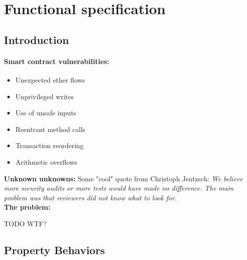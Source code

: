 \section{Functional specification}
\subsection{Introduction}
\paragraph{Smart contract vulnerabilities:}
\begin{itemize}
    \item Unexpected ether flows
    \item Unprivileged writes
    \item Use of unsafe inputs
    \item Reentrant method calls
    \item Transaction reordering
    \item Arithmetic overflows
\end{itemize}{}
\textbf{\color{blue}Unknown unknowns: }Some "cool" quote from Christoph Jentzsch: \textit{We believe more security audits or more tests would have made no difference. The main problem was that reviewers did not know what to look for.}\\
\textbf{The problem: \newline}
\begin{minipage}{0.5\linewidth}
    \centering      
    \def\svgwidth{\linewidth}
        
\end{minipage}
TODO WTF?
\subsection{Property Behaviors}
